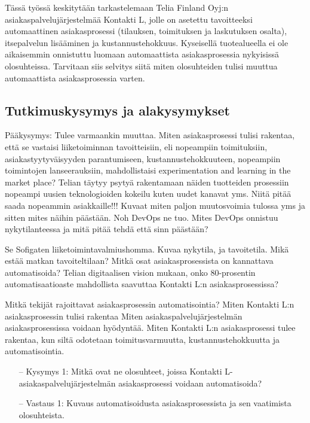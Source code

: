 \documentclass[finnish,12pt,a4paper,pdftex]{article}
\begin{document}
Tässä työssä keskitytään tarkastelemaan
Telia Finland Oyj:n asiakaspalvelujärjestelmää Kontakti L, jolle on asetettu tavoitteeksi automaattinen asiakasprosessi (tilauksen, toimituksen ja laskutuksen osalta), itsepalvelun lisääminen ja kustannustehokkuus. Kyseisellä tuotealueella ei ole aikaisemmin onnistuttu luomaan automaattista asiakasprosessia nykyisissä olosuhteissa. Tarvitaan siis selvitys siitä miten olosuhteiden tulisi muuttua automaattista asiakasprosessia varten.

\subsection{Tutkimuskysymys ja alakysymykset}

Pääkysymys: Tulee varmaankin muuttaa.
Miten asiakasprosessi tulisi rakentaa, että se vastaisi liiketoiminnan tavoitteisiin, eli nopeampiin toimituksiin, asiakastyytyväisyyden parantumiseen, kustannustehokkuuteen, nopeampiin toimintojen lanseerauksiin, mahdollistaisi experimentation and learning in the market place?
Telian täytyy psytyä rakentamaan näiden tuotteiden prosessiin nopeampi uusien teknologioiden kokeilu kuten uudet kanavat  yms. Niitä pitää saada nopeammin asiakkaille!!! Kuvaat miten paljon muutosvoimia tulossa yms ja sitten mites näihin päästään. Noh DevOps ne tuo. Mites DevOps onnistuu nykytilanteessa ja mitä pitää tehdä että sinn päästään?

Se Sofigaten liiketoimintavalmiushomma. Kuvaa nykytila, ja tavoitetila. Mikä estää matkan tavoiteltilaan? 
Mitkä osat asiakasprosessista on kannattava automatisoida?
Telian digitaalisen vision mukaan, onko 80-prosentin automatisaatioaste mahdollista saavuttaa Kontakti L:n asiakasprosessissa?

Mitkä tekijät rajoittavat asiakasprosessin automatisointia?
Miten Kontakti L:n asiakasprosessin tulisi rakentaa Miten asiakaspalvelujärjestelmän asiakasprosessissa voidaan hyödyntää.
Miten Kontakti L:n asiakasprosessi tulee rakentaa, kun siltä odotetaan toimitusvarmuutta, kustannustehokkuutta ja automatisointia.
\begin{itemize}
\item[--]Kysymys 1: Mitkä ovat ne olosuhteet, joissa Kontakti L- asiakaspalvelujärjestelmän asiakasprosessi voidaan automatisoida?
\item[--]Vastaus 1: Kuvaus automatisoidusta asiakasprosessista ja sen vaatimista olosuhteista.
\end{itemize}
\end{document}
